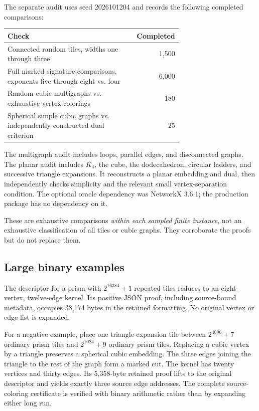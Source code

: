 \documentclass[11pt]{article}
\theoremstyle{remark}\newtheorem{remark}[theorem]{Remark}
\begin{document}
The separate audit uses seed 2026101204 and records the following completed comparisons:
\begin{center}
\begin{tabular}{>{\raggedright\arraybackslash}p{0.69\linewidth}r}
\toprule
Check & Completed\\
\midrule
Connected random tiles, widths one through three & 1,500\\
Full marked signature comparisons, exponents five through eight vs. four & 6,000\\
Random cubic multigraphs vs. exhaustive vertex colorings & 180\\
Spherical simple cubic graphs vs. independently constructed dual criterion & 25\\
\bottomrule
\end{tabular}
\end{center}
The multigraph audit includes loops, parallel edges, and disconnected graphs. The planar audit includes $K_4$, the cube, the dodecahedron, circular ladders, and successive triangle expansions. It reconstructs a planar embedding and dual, then independently checks simplicity and the relevant small vertex-separation condition. The optional oracle dependency was NetworkX 3.6.1; the production package has no dependency on it.

These are exhaustive comparisons \emph{within each sampled finite instance}, not an exhaustive classification of all tiles or cubic graphs. They corroborate the proofs but do not replace them.

\subsection{Large binary examples}
The descriptor for a prism with $2^{16384}+1$ repeated tiles reduces to an eight-vertex, twelve-edge kernel. Its positive JSON proof, including source-bound metadata, occupies 38,174 bytes in the retained formatting. No original vertex or edge list is expanded.

For a negative example, place one triangle-expansion tile between $2^{4096}+7$ ordinary prism tiles and $2^{1024}+9$ ordinary prism tiles. Replacing a cubic vertex by a triangle preserves a spherical cubic embedding. The three edges joining the triangle to the rest of the graph form a marked cut. The kernel has twenty vertices and thirty edges. Its 5,358-byte retained proof lifts to the original descriptor and yields exactly three source edge addresses. The complete source-coloring certificate is verified with binary arithmetic rather than by expanding either long run.
\end{document}
